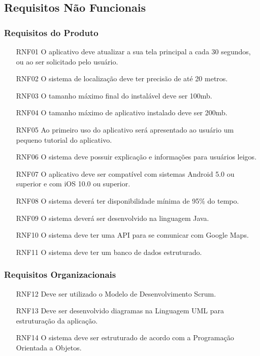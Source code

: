 \documentclass[12pt]{article}
\begin{document}
\subsection{Requisitos Não Funcionais}
\label{subsec:RequisitosNaoFuncionais}
\subsubsection{Requisitos do Produto}
\begin{enumerate}
    \item [RNF01] O aplicativo deve atualizar a sua tela principal a cada 30 segundos, ou ao ser solicitado pelo usuário.%
    \item [RNF02] O sistema de localização deve ter precisão de até 20 metros.%
    \item [RNF03] O tamanho máximo final do instalável deve ser 100mb.%
    \item [RNF04] O tamanho máximo de aplicativo instalado deve ser 200mb.%
    \item [RNF05] Ao primeiro uso do aplicativo será apresentado ao usuário um pequeno tutorial do aplicativo.%
    \item [RNF06] O sistema deve possuir explicação e informações para usuários leigos.%
    \item [RNF07] O aplicativo deve ser compatível com sistemas Android 5.0 ou superior e com iOS 10.0 ou superior.
    \item [RNF08] O sistema deverá ter disponibilidade mínima de 95\% do tempo.%
    \item [RNF09] O sistema deverá ser desenvolvido na linguagem Java.%
    \item [RNF10] O sistema deve ter uma API para se comunicar com Google Maps.%
    \item [RNF11] O sistema deve ter um banco de dados estruturado.%
\end{enumerate}
\subsubsection{Requisitos Organizacionais}
\begin{enumerate}
    \item [RNF12] Deve ser utilizado o Modelo de Desenvolvimento Scrum.%
    \item [RNF13] Deve ser desenvolvido diagramas na Linguagem UML para estruturação da aplicação.%
    \item [RNF14] O sistema deve ser estruturado de acordo com a Programação Orientada a Objetos.%
\end{enumerate}
\end{document}
